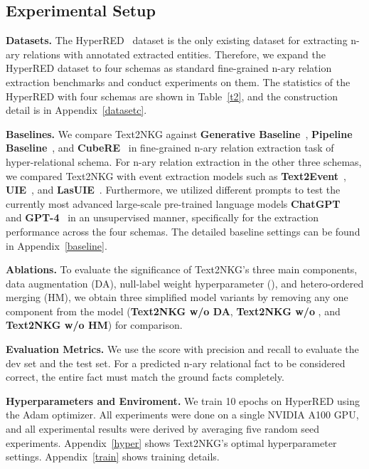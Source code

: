 \documentclass{article} \usepackage{iclr2024_conference,times}
\begin{document}
\subsection{Experimental Setup}

\textbf{Datasets. }
The HyperRED~\citep{HyperRED} dataset is the only existing dataset for extracting n-ary relations with annotated extracted entities. Therefore, we expand the HyperRED dataset to four schemas as standard fine-grained n-ary relation extraction benchmarks and conduct experiments on them. The statistics of the HyperRED with four schemas are shown in Table~\ref{t2}, and the construction detail is in Appendix~\ref{datasetc}.

\textbf{Baselines. } We compare Text2NKG against \textbf{Generative Baseline}~\citep{BART}, \textbf{Pipeline Baseline}~\citep{UniRE}, and \textbf{CubeRE}~\citep{HyperRED} in fine-grained n-ary relation extraction task of hyper-relational schema. For n-ary relation extraction in the other three schemas, we compared Text2NKG with event extraction models such as \textbf{Text2Event}~\citep{Text2Event}, \textbf{UIE}~\citep{UIE}, and \textbf{LasUIE}~\citep{LasUIE}. Furthermore, we utilized different prompts to test the currently most advanced large-scale pre-trained language models \textbf{ChatGPT}~\citep{ChatGPT} and \textbf{GPT-4}~\citep{GPT-4} in an unsupervised manner, specifically for the extraction performance across the four schemas. The detailed baseline settings can be found in Appendix~\ref{baseline}.

\textbf{Ablations. } To evaluate the significance of Text2NKG's three main components, data augmentation (DA), null-label weight hyperparameter (), and hetero-ordered merging (HM), we obtain three simplified model variants by removing any one component from the model (\textbf{Text2NKG w/o DA}, \textbf{Text2NKG w/o }, and \textbf{Text2NKG w/o HM}) for comparison.


\textbf{Evaluation Metrics. }
We use the  score with precision and recall to evaluate the dev set and the test set. For a predicted n-ary relational fact to be considered correct, the entire fact must match the ground facts completely.

\textbf{Hyperparameters and Enviroment. }
We train 10 epochs on HyperRED using the Adam optimizer. All experiments were done on a single NVIDIA A100 GPU, and all experimental results were derived by averaging five random seed experiments. Appendix~\ref{hyper} shows Text2NKG's optimal hyperparameter settings. Appendix~\ref{train} shows training details.
\end{document}

